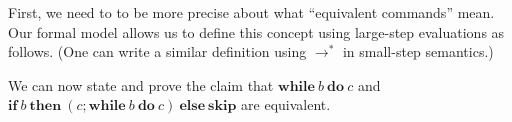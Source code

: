 First, we need to to be more precise about what ``equivalent commands'' mean. Our formal model
allows us to define this concept using large-step evaluations as follows. (One can write a
similar definition using $\to^*$ in small-step semantics.)


We can now state and prove the claim that $\mathbf{while}\ b\ \mathbf{do}\ c$ and $\mathbf{if}\
b\ \mathbf{then}\ (c; \mathbf{while}\ b\ \mathbf{do}\ c)\ \mathbf{else}\ \mathbf{skip}$ are
equivalent.


